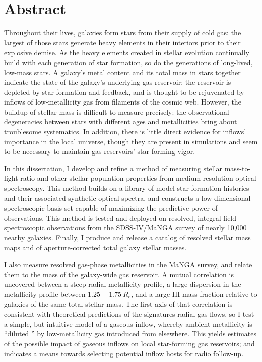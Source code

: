 \chapter*{Abstract}

Throughout their lives, galaxies form stars from their supply of cold gas: the largest of those stars generate heavy elements in their interiors prior to their explosive demise. As the heavy elements created in stellar evolution continually build with each generation of star formation, so do the generations of long-lived, low-mass stars. A galaxy's metal content and its total mass in stars together indicate the state of the galaxy's underlying gas reservoir: the reservoir is depleted by star formation and feedback, and is thought to be rejuvenated by inflows of low-metallicity gas from filaments of the cosmic web. However, the buildup of stellar mass is difficult to measure precisely: the observational degeneracies between stars with different ages and metallicities bring about troublesome systematics. In addition, there is little direct evidence for inflows' importance in the local universe, though they are present in simulations and seem to be necessary to maintain gas reservoirs' star-forming vigor. 

In this dissertation, I develop and refine a method of measuring stellar mass-to-light ratio and other stellar population properties from medium-resolution optical spectroscopy. This method builds on a library of model star-formation histories and their associated synthetic optical spectra, and constructs a low-dimensional spectroscopic basis set capable of maximizing the predictive power of observations. This method is tested and deployed on resolved, integral-field spectroscopic observations from the SDSS-IV/MaNGA survey of nearly 10,000 nearby galaxies. Finally, I produce and release a catalog of resolved stellar mass maps and of aperture-corrected total galaxy stellar masses.

I also measure resolved gas-phase metallicities in the MaNGA survey, and relate them to the mass of the galaxy-wide gas reservoir. A mutual correlation is uncovered between a steep radial metallicity profile, a large dispersion in the metallicity profile between $1.25 - 1.75 ~ R_e$, and a large HI mass fraction relative to galaxies of the same total stellar mass. The first axis of that correlation is consistent with theoretical predictions of the signatures radial gas flows, so I test a simple, but intuitive model of a gaseous inflow, whereby ambient metallicity is ``diluted '' by low-metallicity gas introduced from elsewhere. This yields estimates of the possible impact of gaseous inflows on local star-forming gas reservoirs; and indicates a means towards selecting potential inflow hosts for radio follow-up.
